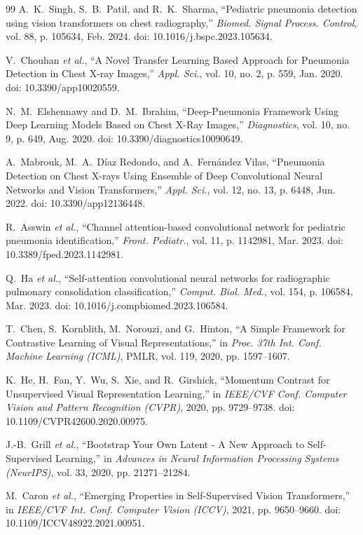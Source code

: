 \documentclass[journal,article,submit,moreauthors,pdftex]{Definitions/tsp}
\begin{document}
\begin{thebibliography}{99}
A.~K.~Singh, S.~B.~Patil, and R.~K.~Sharma, ``Pediatric pneumonia detection using vision transformers on chest radiography,'' \emph{Biomed. Signal Process. Control}, vol. 88, p. 105634, Feb. 2024. doi: 10.1016/j.bspc.2023.105634.

V.~Chouhan \emph{et al.}, ``A Novel Transfer Learning Based Approach for Pneumonia Detection in Chest X-ray Images,'' \emph{Appl. Sci.}, vol. 10, no. 2, p. 559, Jan. 2020. doi: 10.3390/app10020559.

N.~M.~Elshennawy and D.~M.~Ibrahim, ``Deep-Pneumonia Framework Using Deep Learning Models Based on Chest X-Ray Images,'' \emph{Diagnostics}, vol. 10, no. 9, p. 649, Aug. 2020. doi: 10.3390/diagnostics10090649.

A.~Mabrouk, M.~A.~Díaz Redondo, and A.~Fernández Vilas, ``Pneumonia Detection on Chest X-rays Using Ensemble of Deep Convolutional Neural Networks and Vision Transformers,'' \emph{Appl. Sci.}, vol. 12, no. 13, p. 6448, Jun. 2022. doi: 10.3390/app12136448.

R.~Asswin \emph{et al.}, ``Channel attention-based convolutional network for pediatric pneumonia identification,'' \emph{Front. Pediatr.}, vol. 11, p. 1142981, Mar. 2023. doi: 10.3389/fped.2023.1142981.

Q.~Ha \emph{et al.}, ``Self-attention convolutional neural networks for radiographic pulmonary consolidation classification,'' \emph{Comput. Biol. Med.}, vol. 154, p. 106584, Mar. 2023. doi: 10.1016/j.compbiomed.2023.106584.

T.~Chen, S.~Kornblith, M.~Norouzi, and G.~Hinton, ``A Simple Framework for Contrastive Learning of Visual Representations,'' in \emph{Proc. 37th Int. Conf. Machine Learning (ICML)}, PMLR, vol. 119, 2020, pp. 1597--1607.

K.~He, H.~Fan, Y.~Wu, S.~Xie, and R.~Girshick, ``Momentum Contrast for Unsupervised Visual Representation Learning,'' in \emph{IEEE/CVF Conf. Computer Vision and Pattern Recognition (CVPR)}, 2020, pp. 9729--9738. doi: 10.1109/CVPR42600.2020.00975.

J.-B.~Grill \emph{et al.}, ``Bootstrap Your Own Latent - A New Approach to Self-Supervised Learning,'' in \emph{Advances in Neural Information Processing Systems (NeurIPS)}, vol. 33, 2020, pp. 21271--21284.

M.~Caron \emph{et al.}, ``Emerging Properties in Self-Supervised Vision Transformers,'' in \emph{IEEE/CVF Int. Conf. Computer Vision (ICCV)}, 2021, pp. 9650--9660. doi: 10.1109/ICCV48922.2021.00951.


\end{thebibliography}
\end{document}

